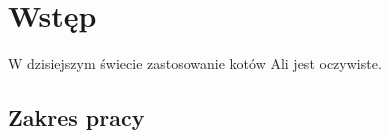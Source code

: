 \chapter*{Wstęp}

W dzisiejszym świecie zastosowanie kotów Ali jest oczywiste. \lipsum[6]

\section*{Zakres pracy}

\lipsum[8]